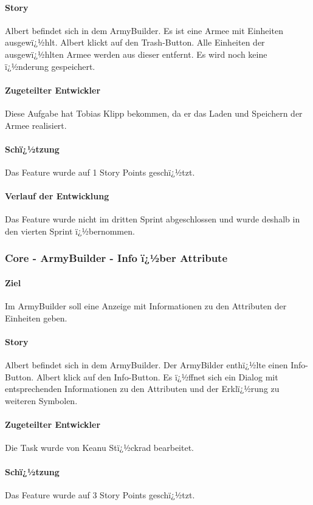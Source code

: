 \documentclass[12pt, titlepage]{scrartcl}
\begin{document}
		\paragraph{Story}Albert befindet sich in dem ArmyBuilder. Es ist eine Armee mit Einheiten ausgewï¿½hlt. Albert klickt auf den Trash-Button. Alle Einheiten der ausgewï¿½hlten Armee werden aus dieser entfernt. Es wird noch keine ï¿½nderung gespeichert.
		\paragraph{Zugeteilter Entwickler} Diese Aufgabe hat Tobias Klipp bekommen, da er das Laden und Speichern der Armee realisiert.
		\paragraph{Schï¿½tzung}
		Das Feature wurde auf 1 Story Points geschï¿½tzt.
		\paragraph{Verlauf der Entwicklung} 
		Das Feature wurde nicht im dritten Sprint abgeschlossen und wurde deshalb in den vierten Sprint ï¿½bernommen.
		
		\subsubsection{Core - ArmyBuilder - Info ï¿½ber Attribute}
		\paragraph{Ziel} Im ArmyBuilder soll eine Anzeige mit Informationen zu den Attributen der Einheiten geben.
		\paragraph{Story}Albert befindet sich in dem ArmyBuilder. Der ArmyBilder enthï¿½lte einen Info-Button. Albert klick auf den Info-Button. Es ï¿½ffnet sich ein Dialog mit entsprechenden Informationen zu den Attributen und der Erklï¿½rung zu weiteren Symbolen.
		\paragraph{Zugeteilter Entwickler} Die Task wurde von Keanu Stï¿½ckrad bearbeitet.
		\paragraph{Schï¿½tzung}
		Das Feature wurde auf 3 Story Points geschï¿½tzt.
\end{document}

